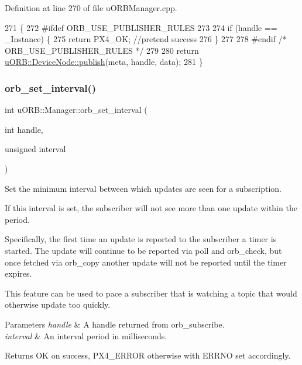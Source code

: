 Definition at line 270 of file u\+O\+R\+B\+Manager.\+cpp.


\begin{DoxyCode}
271 \{
272 \textcolor{preprocessor}{#ifdef ORB\_USE\_PUBLISHER\_RULES}
273 
274     \textcolor{keywordflow}{if} (handle == \_Instance) \{
275         \textcolor{keywordflow}{return} PX4\_OK; \textcolor{comment}{//pretend success}
276     \}
277 
278 \textcolor{preprocessor}{#endif }\textcolor{comment}{/* ORB\_USE\_PUBLISHER\_RULES */}\textcolor{preprocessor}{}
279 
280     \textcolor{keywordflow}{return} \hyperlink{classuORB_1_1DeviceNode_ae715517a1f3a2f361e37d061b59a4560}{uORB::DeviceNode::publish}(meta, handle, data);
281 \}
\end{DoxyCode}
\mbox{\label{classuORB_1_1Manager_aade04ff2a8a3aaf275b39fc32934fc56}} 
\subsubsection{\texorpdfstring{orb\+\_\+set\+\_\+interval()}{orb\_set\_interval()}}
{\footnotesize\ttfamily int u\+O\+R\+B\+::\+Manager\+::orb\+\_\+set\+\_\+interval (\begin{DoxyParamCaption}\item[{int}]{handle,  }\item[{unsigned}]{interval }\end{DoxyParamCaption})}

Set the minimum interval between which updates are seen for a subscription.

If this interval is set, the subscriber will not see more than one update within the period.

Specifically, the first time an update is reported to the subscriber a timer is started. The update will continue to be reported via poll and orb\+\_\+check, but once fetched via orb\+\_\+copy another update will not be reported until the timer expires.

This feature can be used to pace a subscriber that is watching a topic that would otherwise update too quickly.


\begin{DoxyParams}{Parameters}
{\em handle} & A handle returned from orb\+\_\+subscribe. \\
\hline
{\em interval} & An interval period in milliseconds. \\
\hline
\end{DoxyParams}
\begin{DoxyReturn}{Returns}
OK on success, P\+X4\+\_\+\+E\+R\+R\+OR otherwise with E\+R\+R\+NO set accordingly. 
\end{DoxyReturn}


